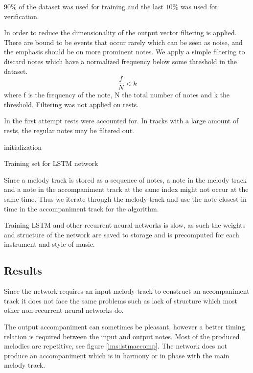 $90\%$ of the dataset was used for training and the last $10\%$ was used for verification.

In order to reduce the dimensionality of the output vector filtering is applied. There are bound to be events that occur rarely which can be seen as noise, and the emphasis should be on more prominent notes.
We apply a simple filtering to discard notes which have a normalized frequency below some threshold in the dataset.
\[ \frac{f}{N} < k \]
where f is the frequency of the note, N the total number of notes and k the threshold. Filtering was not applied on rests. 

In the first attempt rests were accounted for. In tracks with a large amount of rests, the regular notes may be filtered out.

\begin{algorithm}
 initialization\;
 
\caption{Training set for LSTM network}
\end{algorithm}
Since a melody track is stored as a sequence of notes, a note in the melody track and a note in the accompaniment track at the same index might not occur at the same time. Thus we iterate through the melody track and use the note closest in time in the accompaniment track for the algorithm.

Training \ac{LSTM} and other recurrent neural networks is slow, as such the weights and structure of the network are saved to storage and is precomputed for each instrument and style of music.

\subsection{Results}
Since the network requires an input melody track to construct an accompaniment track it does not face the same problems such as lack of structure which most other non-recurrent neural networks do.

The output accompaniment can sometimes be pleasant, however a better timing relation is required between the input and output notes. Most of the produced melodies are repetitive, see figure \ref{ims:lstmaccomp}. The network does not produce an accompaniment which is in harmony or in phase with the main melody track.

